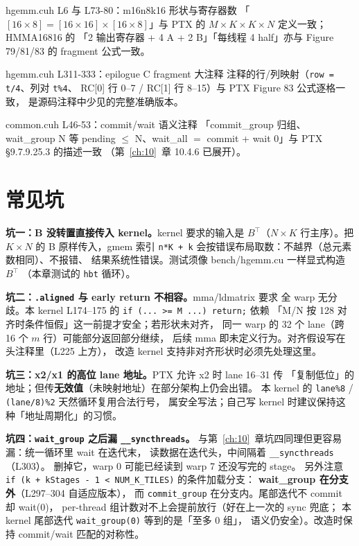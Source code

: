 \begin{kaogu}[F2 核校通过]{hgemm.cuh L6 与 L73-80：m16n8k16 形状与寄存器数}
  「$[16\times8] = [16\times16]\times[16\times8]$」与 PTX 的
  $M{\times}K \times K{\times}N$ 定义一致；HMMA16816 的
  「2 输出寄存器 + 4 A + 2 B」「每线程 4 half」亦与
  Figure 79/81/83 的 fragment 公式一致。
\end{kaogu}

\begin{kaogu}[F2 核校通过]{hgemm.cuh L311-333：epilogue C fragment 大注释}
  注释的行/列映射（\texttt{row = t/4}、列对 \texttt{t\%4}、
  RC[0] 行 0--7 / RC[1] 行 8--15）与 PTX Figure 83 公式逐格一致，
  是源码注释中少见的完整准确版本。
\end{kaogu}

\begin{kaogu}[F3 核校通过]{common.cuh L46-53：commit/wait 语义注释}
  「commit\_group 归组、wait\_group N 等 pending $\le$ N、wait\_all $=$
  commit + wait 0」与 PTX §9.7.9.25.3 的描述一致
  （第~\ref{ch:10}~章 10.4.6 已展开）。
\end{kaogu}

\section{常见坑}

\textbf{坑一：B 没转置直接传入 kernel。}\allowbreak{}kernel 要求的输入是 $B^{\top}$（$N\times K$
行主序）。把 $K\times N$ 的 B 原样传入，gmem 索引
\texttt{n*K + k} 会按错误布局取数：不越界（总元素数相同）、不报错、
结果系统性错误。测试须像 bench/hgemm.cu 一样显式构造 $B^{\top}$
（本章测试的 \texttt{hbt} 循环）。

\textbf{坑二：\texttt{.aligned} 与 early return 不相容。}\allowbreak{}mma/ldmatrix 要求
全 warp 无分歧。本 kernel L174--175 的
\texttt{if (... >= M ...) return;} 依赖
「M/N 按 128 对齐时条件恒假」这一前提才安全；若形状未对齐，
同一 warp 的 32 个 lane（跨 16 个 $m$ 行）可能部分返回部分继续，
后续 mma 即未定义行为。对齐假设写在头注释里（L225 上方），
改造 kernel 支持非对齐形状时必须先处理这里。

\textbf{坑三：x2/x1 的高位 lane 地址。}\allowbreak{}PTX 允许 x2 时 lane 16--31 传
「复制低位」的地址；但传\textbf{无效值}（未映射地址）在部分架构上仍会出错。
本 kernel 的 \texttt{lane\%8} / \texttt{(lane/8)\%2} 天然循环复用合法行号，
属安全写法；自己写 kernel 时建议保持这种「地址周期化」的习惯。

\textbf{坑四：\texttt{wait\_group} 之后漏 \texttt{\_\allowbreak{}\_\allowbreak{}syncthreads}。}
与第~\ref{ch:10}~章坑四同理但更容易漏：统一循环里 wait 在迭代末，
读数据在迭代头，中间隔着 \texttt{\_\allowbreak{}\_\allowbreak{}syncthreads}（L303）。
删掉它，warp 0 可能已经读到 warp 7 还没写完的 stage。
另外注意 \texttt{if \allowbreak{}(k + k\allowbreak{}Stages - 1 \allowbreak{}< NUM\_\allowbreak{}K\_\allowbreak{}TILES)} 的条件加载分支：
\textbf{wait\_group 在分支外}（L297--304 自适应版本），
而 \texttt{commit\_\allowbreak{}group} 在分支内。尾部迭代不 commit 却 wait(0)，
per-thread 组计数对不上会提前放行（好在上一次的 sync 兜底；
本 kernel 尾部迭代 \texttt{wait\_\allowbreak{}group\allowbreak{}(0)} 等到的是「至多 0 组」，
语义仍安全）。改造时保持 commit/wait 匹配的对称性。

